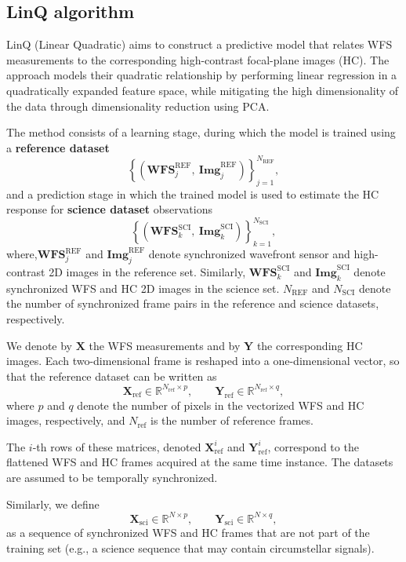 
\subsection{LinQ algorithm}

LinQ (Linear Quadratic) aims to construct a predictive model that relates WFS measurements to the corresponding high-contrast focal-plane images (HC). The approach models their quadratic relationship by performing linear regression in a quadratically expanded feature space, while mitigating the high dimensionality of the data through dimensionality reduction using PCA.

The method consists of a learning stage, during which the model is trained using a \textbf{reference dataset}
\[
\left\{ \left(\mathbf{WFS}^{\mathrm{REF}}_j,\ \mathbf{Img}^{\mathrm{REF}}_j \right) \right\}_{j=1}^{N_{\mathrm{REF}}},
\]
and a prediction stage in which the trained model is used to estimate the HC response for \textbf{science dataset} observations
\[
\left\{ \left(\mathbf{WFS}^{\mathrm{SCI}}_k,\ \mathbf{Img}^{\mathrm{SCI}}_k \right) \right\}_{k=1}^{N_{\mathrm{SCI}}},
\]
where,\(\mathbf{WFS}^{\mathrm{REF}}_j\) and \(\mathbf{Img}^{\mathrm{REF}}_j\) denote synchronized wavefront sensor and high-contrast 2D images in the reference set. Similarly, \(\mathbf{WFS}^{\mathrm{SCI}}_k\) and \(\mathbf{Img}^{\mathrm{SCI}}_k\) denote synchronized WFS and HC 2D images in the science set. \(N_{\mathrm{REF}}\) and \(N_{\mathrm{SCI}}\) denote the number of synchronized frame pairs in the reference and science datasets, respectively.

We denote by \(\mathbf{X}\) the WFS measurements and by \(\mathbf{Y}\) the corresponding HC images. Each two-dimensional frame is reshaped into a one-dimensional vector, so that the reference dataset can be written as
\[
\mathbf{X}_{\mathrm{ref}} \in \mathbb{R}^{N_{\mathrm{ref}} \times p},
\qquad
\mathbf{Y}_{\mathrm{ref}} \in \mathbb{R}^{N_{\mathrm{ref}} \times q},
\]
where \(p\) and \(q\) denote the number of pixels in the vectorized WFS and HC images, respectively, and \(N_{\mathrm{ref}}\) is the number of reference frames.

The \(i\)-th rows of these matrices, denoted \(\mathbf{X}_{\mathrm{ref}}^{i}\) and \(\mathbf{Y}_{\mathrm{ref}}^{i}\), correspond to the flattened WFS and HC frames acquired at the same time instance. The datasets are assumed to be temporally synchronized.

Similarly, we define
\[
\mathbf{X}_{\mathrm{sci}} \in \mathbb{R}^{N \times p},
\qquad
\mathbf{Y}_{\mathrm{sci}} \in \mathbb{R}^{N \times q},
\]
as a sequence of synchronized WFS and HC frames that are not part of the training set (e.g., a science sequence that may contain circumstellar signals).



